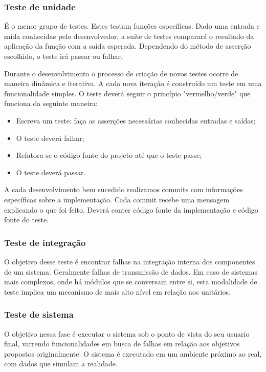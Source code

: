 \documentclass[
	article,			%
	12pt,				%
	oneside,			%
	a4paper,			%
	english,			
	brazil,
	sumario=tradicional
	]{abntex2}
\begin{document}
\subsubsection{Teste de unidade}

É o menor grupo de testes. Estes testam funções específicas. Dado uma entrada e saída conhecidas pelo desenvolvedor, a suite de testes comparará o resultado da aplicação da função com a saída esperada. Dependendo do método de asserção escolhido, o teste irá passar ou falhar.

Durante o desenvolvimento o processo de criação de novos testes ocorre de maneira dinâmica e iterativa. A cada nova iteração é construído um teste em uma funcionalidade simples. 
O teste deverá seguir o princípio "vermelho/verde" que funciona da seguinte maneira:
\begin{itemize}
	\item{Escreva um teste: faça as asserções necessárias conhecidas entradas e saídas;}
	\item{O teste deverá falhar;}	
	\item{Refatora-se o código fonte do projeto até que o teste passe;}
	\item{O teste deverá passar.}
\end{itemize}

A cada desenvolvimento bem sucedido realizamos commits com informações específicas sobre a implementação. Cada commit recebe uma mensagem explicando o que foi feito. Deverá conter código fonte da implementação e código fonte do teste.

\subsubsection{Teste de integração}
O objetivo desse teste é encontrar falhas na integração interna dos componentes de um sistema. Geralmente falhas de transmissão de dados. Em caso de sistemas mais complexos, onde há módulos que se conversam entre si, esta modalidade de teste implica um mecanismo de mais alto nível em relação aos unitários.

\subsubsection{Teste de sistema}
O objetivo nessa fase é executar o sistema sob o ponto de vista do seu usuario final, varrendo funcionalidades em busca de falhas em relação aos objetivos propostos originalmente. O sistema é executado em um ambiente próximo ao real, com dados que simulam a realidade.
\end{document}
